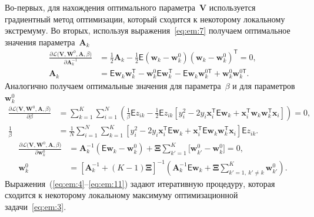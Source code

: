 \documentclass[12pt, twoside]{article}
\numberwithin{equation}{section}
\begin{document}
Во-первых, для нахождения оптимального параметра~$\textbf{V}$ используется градиентный метод оптимизации, который сходится к некоторому локальному экстремуму.
Во вторых, используя выражения~\eqref{eq:em:7} получаем оптимальное значения параметра~$\textbf{A}_{k}$
\[
\label{eq:em:9}
\begin{aligned}
\frac{\partial \mathcal{L}\bigr(\textbf{V}, \textbf{W}^{0}, \textbf{A}, \beta\bigr)}{\partial \textbf{A}^{-1}_k} &=  \frac{1}{2}\textbf{A}_{k} - \frac{1}{2}\mathsf{E}\left(\textbf{w}_{k} - \textbf{w}_{k}^{0}\right)\left(\textbf{w}_{k} - \textbf{w}_{k}^{0}\right)^{\mathsf{T}} = 0,\\
\textbf{A}_{k} &= \mathsf{E}\textbf{w}_{k}\textbf{w}_{k}^{\mathsf{T}} - \textbf{w}_{k}^{0}\mathsf{E}\textbf{w}_{k}^{\mathsf{T}} - \mathsf{E}\textbf{w}_{k}\textbf{w}_{k}^{0\mathsf{T}} + \textbf{w}_{k}^{0}\textbf{w}_{k}^{0\mathsf{T}}.
\end{aligned}
\]
Аналогично получаем оптимальные значения для параметра~$\beta$ и для параметров~$\textbf{w}_{k}^{0}$
\[
\label{eq:em:10}
\begin{aligned}
\frac{\partial \mathcal{L}\bigr(\textbf{V}, \textbf{W}^{0}, \textbf{A}, \beta\bigr)}{\partial \beta} &= \sum_{k=1}^{K}\sum_{i=1}^{N}\left(\frac{1}{\beta}\mathsf{E}z_{ik}-\frac{1}{2}\mathsf{E}z_{ik}\left[y_{i}^{2}-2y_{i}\textbf{x}_{i}^{\mathsf{T}}\mathsf{E}\textbf{w}_{k}+\textbf{x}_{i}^{\mathsf{T}}\textbf{w}_{k}\textbf{w}_{k}^{\mathsf{T}}\textbf{x}_{i}\right]\right) = 0,\\
\frac{1}{\beta}&=\frac{1}{N}\sum_{i=1}^{N}\sum_{k=1}^{K}\left[y_{i}^{2}-2y_{i}\textbf{x}_{i}^{\mathsf{T}}\mathsf{E}\textbf{w}_{k} + \textbf{x}_{i}^{\mathsf{T}}\mathsf{E}\textbf{w}_{k}\textbf{w}_{k}^{\mathsf{T}}\textbf{x}_{i}\right]\mathsf{E}z_{ik}.
\end{aligned}
\]
\[
\label{eq:em:11}
\begin{aligned}
\frac{\partial \mathcal{L}\bigr(\textbf{V}, \textbf{W}^{0}, \textbf{A}, \beta\bigr)}{\partial \mathbf{w}_k^0} &= \mathbf{A}_k^{-1}\left(\mathsf{E}\mathbf{w}_k - \mathbf{w}_{k}^{0}\right) + \bm{\Xi}\sum_{k'=1}^{K}\bigr[\mathbf{w}_{k'}^{0} -\mathbf{w}_{k}^{0}\bigr] = 0,\\
\textbf{w}_{k}^{0} &=\left[\textbf{A}_{k}^{-1}+\left(K-1\right)\bm{\Xi}\right]^{-1}\left(\textbf{A}^{-1}_{k}\mathsf{E}\textbf{w}_{k}+\bm{\Xi}\sum_{k'=1,~k'\not=k}^{K}\textbf{w}_{k'}^{0}\right).
\end{aligned}
\]
Выражения~(\ref{eq:em:4}--\ref{eq:em:11}) задают итеративную процедуру, которая сходится к некоторому локальному максимуму оптимизационной задачи~\eqref{eq:em:3}.
\end{document}
